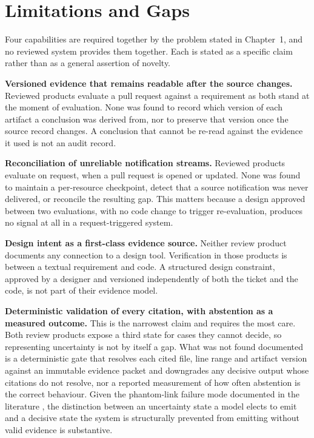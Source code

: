 \section{Limitations and Gaps}

Four capabilities are required together by the problem stated in Chapter~1, and
no reviewed system provides them together. Each is stated as a specific claim
rather than as a general assertion of novelty.

\textbf{Versioned evidence that remains readable after the source changes.}
Reviewed products evaluate a pull request against a requirement as both stand at
the moment of evaluation. None was found to record which version of each
artifact a conclusion was derived from, nor to preserve that version once the
source record changes. A conclusion that cannot be re-read against the evidence
it used is not an audit record.

\textbf{Reconciliation of unreliable notification streams.} Reviewed products
evaluate on request, when a pull request is opened or updated. None was found to
maintain a per-resource checkpoint, detect that a source notification was never
delivered, or reconcile the resulting gap. This matters because a design
approved between two evaluations, with no code change to trigger
re-evaluation, produces no signal at all in a request-triggered system.

\textbf{Design intent as a first-class evidence source.} Neither review product
documents any connection to a design tool. Verification in those products is
between a textual requirement and code. A structured design constraint,
approved by a designer and versioned independently of both the ticket and the
code, is not part of their evidence model.

\textbf{Deterministic validation of every citation, with abstention as a
measured outcome.} This is the narrowest claim and requires the most care. Both
review products expose a third state for cases they cannot decide, so
representing uncertainty is not by itself a gap. What was not found documented
is a deterministic gate that resolves each cited file, line range and artifact
version against an immutable evidence packet and downgrades any decisive output
whose citations do not resolve, nor a reported measurement of how often
abstention is the correct behaviour. Given the phantom-link failure mode
documented in the literature \cite{alor2025}, the distinction between an
uncertainty state a model elects to emit and a decisive state the system is
structurally prevented from emitting without valid evidence is substantive.


